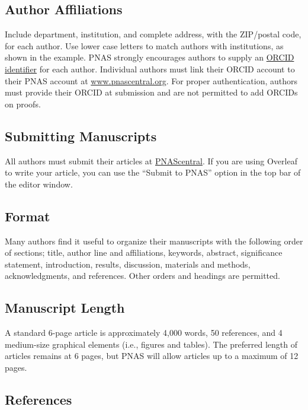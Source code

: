 \documentclass[9pt,twocolumn,twoside,lineno]{pnas-new}
\begin{document}
\subsection*{Author Affiliations}

Include department, institution, and complete address, with the ZIP/postal code, for each author. Use lower case letters to match authors with institutions, as shown in the example. PNAS strongly encourages authors to supply an \href{https://orcid.org/}{ORCID identifier} for each author. Individual authors must link their ORCID account to their PNAS account at \href{http://www.pnascentral.org/}{www.pnascentral.org}. For proper authentication, authors must provide their ORCID at submission and are not permitted to add ORCIDs on proofs.

\subsection*{Submitting Manuscripts}

All authors must submit their articles at \href{http://www.pnascentral.org/cgi-bin/main.plex}{PNAScentral}. If you are using Overleaf to write your article, you can use the ``Submit to PNAS'' option in the top bar of the editor window. 

\subsection*{Format}

Many authors find it useful to organize their manuscripts with the following order of sections;  title, author line and affiliations, keywords, abstract, significance statement, introduction, results, discussion, materials and methods, acknowledgments, and references. Other orders and headings are permitted.

\subsection*{Manuscript Length}

A standard 6-page article is approximately 4,000 words, 50 references, and 4 medium-size graphical elements (i.e., figures and tables). The preferred length of articles remains at 6 pages, but PNAS will allow articles up to a maximum of 12 pages.

\subsection*{References}
\end{document}
